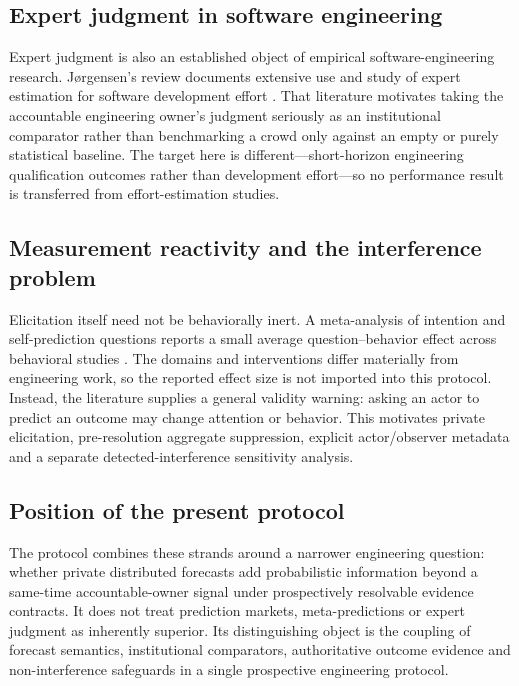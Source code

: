 \subsection{Expert judgment in software engineering}
Expert judgment is also an established object of empirical software-engineering research. J{\o}rgensen's review documents extensive use and study of expert estimation for software development effort \citep{jorgensen2004}. That literature motivates taking the accountable engineering owner's judgment seriously as an institutional comparator rather than benchmarking a crowd only against an empty or purely statistical baseline. The target here is different---short-horizon engineering qualification outcomes rather than development effort---so no performance result is transferred from effort-estimation studies.

\subsection{Measurement reactivity and the interference problem}
Elicitation itself need not be behaviorally inert. A meta-analysis of intention and self-prediction questions reports a small average question--behavior effect across behavioral studies \citep{wood2016}. The domains and interventions differ materially from engineering work, so the reported effect size is not imported into this protocol. Instead, the literature supplies a general validity warning: asking an actor to predict an outcome may change attention or behavior. This motivates private elicitation, pre-resolution aggregate suppression, explicit actor/observer metadata and a separate detected-interference sensitivity analysis.

\subsection{Position of the present protocol}
The protocol combines these strands around a narrower engineering question: whether private distributed forecasts add probabilistic information beyond a same-time accountable-owner signal under prospectively resolvable evidence contracts. It does not treat prediction markets, meta-predictions or expert judgment as inherently superior. Its distinguishing object is the coupling of forecast semantics, institutional comparators, authoritative outcome evidence and non-interference safeguards in a single prospective engineering protocol.

